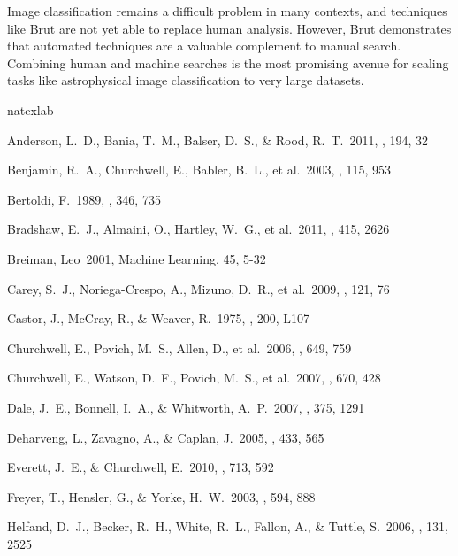 \documentclass[preprint]{aastex}
\begin{document}
Image classification remains a difficult problem in many contexts, and techniques like Brut are not yet able to replace human analysis. However, Brut demonstrates that automated techniques are a valuable complement to manual search.  Combining human and machine searches is the most promising avenue for scaling tasks like astrophysical image classification to very large datasets.


\begin{thebibliography}{16}
\expandafter\ifx\csname natexlab\endcsname\relax\def\natexlab#1{#1}\fi

 Anderson, L.~D., 
Bania, T.~M., Balser, D.~S., \& Rood, R.~T.\ 2011, \apjs, 194, 32 

 Benjamin, R.~A., 
Churchwell, E., Babler, B.~L., et al.\ 2003, \pasp, 115, 953 

 Bertoldi, F.\ 1989, \apj, 
346, 735 

 Bradshaw, E.~J., 
Almaini, O., Hartley, W.~G., et al.\ 2011, \mnras, 415, 2626 

 Breiman, Leo\ 2001, Machine Learning, 45, 5-32

 Carey, S.~J., 
Noriega-Crespo, A., Mizuno, D.~R., et al.\ 2009, \pasp, 121, 76 

 Castor, J., McCray, R., 
\& Weaver, R.\ 1975, \apjl, 200, L107 

 Churchwell, E., 
Povich, M.~S., Allen, D., et al.\ 2006, \apj, 649, 759 

 Churchwell, E., 
Watson, D.~F., Povich, M.~S., et al.\ 2007, \apj, 670, 428 

 Dale, J.~E., Bonnell, 
I.~A., \& Whitworth, A.~P.\ 2007, \mnras, 375, 1291 

 Deharveng, L., Zavagno, A., \& Caplan, J.\ 2005, \aap, 433, 565 

 Everett, J.~E., \& Churchwell, E.\ 2010, \apj, 713, 592 

 Freyer, T., Hensler, G., 
\& Yorke, H.~W.\ 2003, \apj, 594, 888 

 Helfand, D.~J., Becker, 
R.~H., White, R.~L., Fallon, A., \& Tuttle, S.\ 2006, \aj, 131, 2525 


\end{thebibliography}
\end{document}
